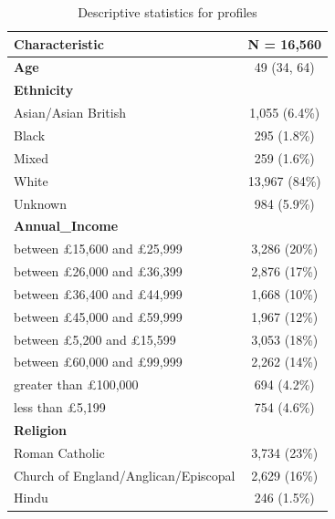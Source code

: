 \documentclass[]{cupjournal}
\begin{document}
\begin{longtable}[t]{lc}
\caption{\label{tab:DescriptivePro}\label{tab:DescriptiveProf}Descriptive statistics for profiles}\\
\toprule
\textbf{Characteristic} & \textbf{N = 16,560}\\
\midrule
\textbf{Age} & 49 (34, 64)\\
\textbf{Ethnicity} & \\
\hspace{1em}Asian/Asian British & 1,055 (6.4\%)\\
\hspace{1em}Black & 295 (1.8\%)\\
\hspace{1em}Mixed & 259 (1.6\%)\\
\hspace{1em}White & 13,967 (84\%)\\
\hspace{1em}Unknown & 984 (5.9\%)\\
\textbf{Annual\_Income} & \\
\hspace{1em}between £15,600 and £25,999 & 3,286 (20\%)\\
\hspace{1em}between £26,000 and £36,399 & 2,876 (17\%)\\
\hspace{1em}between £36,400 and £44,999 & 1,668 (10\%)\\
\hspace{1em}between £45,000 and £59,999 & 1,967 (12\%)\\
\hspace{1em}between £5,200 and £15,599 & 3,053 (18\%)\\
\hspace{1em}between £60,000 and £99,999 & 2,262 (14\%)\\
\hspace{1em}greater than £100,000 & 694 (4.2\%)\\
\hspace{1em}less than £5,199 & 754 (4.6\%)\\
\textbf{Religion} & \\
\hspace{1em}Roman Catholic & 3,734 (23\%)\\
\hspace{1em}Church of England/Anglican/Episcopal & 2,629 (16\%)\\
\hspace{1em}Hindu & 246 (1.5\%)\\

\end{longtable}
\end{document}
